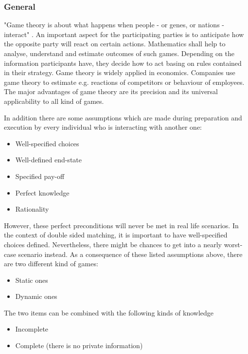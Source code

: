 \subsubsection{General}
"Game theory is about what happens when people - or genes, or nations - interact" \cite[p. 1]{camerer2003behavioral}.
An important aspect for the participating parties is to anticipate how the opposite party will react on certain actions.
Mathematics shall help to analyse, understand and estimate outcomes of such games. 
Depending on the information participants have, they decide how to act basing on rules contained in their strategy.
Game theory is widely applied in economics.
Companies use game theory to estimate e.g. reactions of competitors or behaviour of employees.
The major advantages of game theory are its precision and its universal applicability to all kind of games. \cite[pp. 1-3]{camerer2003behavioral}

In addition there are some assumptions which are made during preparation and execution by every individual who is interacting with another one:
\begin{itemize}
	\item Well-specified choices
	\item Well-defined end-state
	\item Specified pay-off
	\item Perfect knowledge
	\item Rationality 
\end{itemize}

However, these perfect preconditions will never be met in real life scenarios. 
In the context of double sided matching, it is important to have well-specified choices defined. 
Nevertheless, there might be chances to get into a nearly worst-case scenario instead.
As a consequence of these listed assumptions above, there are two different kind of games:
 
\begin{itemize}
	\item Static ones
	\item Dynamic ones
\end{itemize}

The two items can be combined with the following kinds of knowledge

\begin{itemize}
	\item Incomplete
	\item Complete (there is no private information)
\end{itemize}

